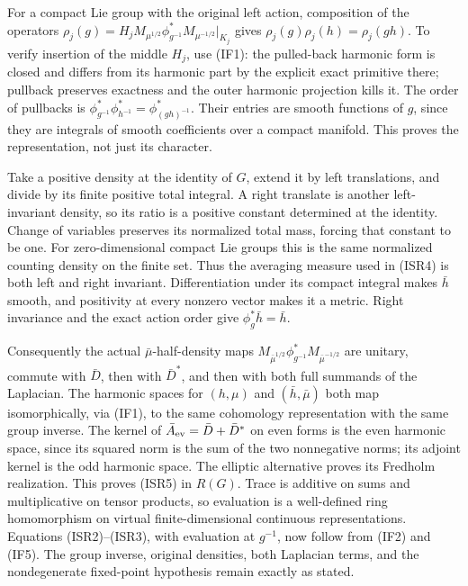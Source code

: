 \documentclass[
  11pt,
]{article}
\begin{document}
For a compact Lie group with the original left action, composition of
the operators
\(\rho_j(g)=H_jM_{\mu^{1/2}}\phi_{g^{-1}}^*M_{\mu^{-1/2}}|_{K_j}\) gives
\(\rho_j(g)\rho_j(h)=\rho_j(gh)\). To verify insertion of the middle
\(H_j\), use (IF1): the pulled-back harmonic form is closed and differs
from its harmonic part by the explicit exact primitive there; pullback
preserves exactness and the outer harmonic projection kills it. The
order of pullbacks is
\(\phi_{g^{-1}}^*\phi_{h^{-1}}^*=\phi_{(gh)^{-1}}^*\). Their entries are
smooth functions of \(g\), since they are integrals of smooth
coefficients over a compact manifold. This proves the representation,
not just its character.

Take a positive density at the identity of \(G\), extend it by left
translations, and divide by its finite positive total integral. A right
translate is another left-invariant density, so its ratio is a positive
constant determined at the identity. Change of variables preserves its
normalized total mass, forcing that constant to be one. For
zero-dimensional compact Lie groups this is the same normalized counting
density on the finite set. Thus the averaging measure used in (ISR4) is
both left and right invariant. Differentiation under its compact
integral makes \(\bar h\) smooth, and positivity at every nonzero vector
makes it a metric. Right invariance and the exact action order give
\(\phi_g^*\bar h=\bar h\).

Consequently the actual \(\bar\mu\)-half-density maps
\(M_{\bar\mu^{1/2}}\phi_{g^{-1}}^*M_{\bar\mu^{-1/2}}\) are unitary,
commute with \(\bar D\), then with \(\bar D^*\), and then with both full
summands of the Laplacian. The harmonic spaces for \((h,\mu)\) and
\((\bar h,\bar\mu)\) both map isomorphically, via (IF1), to the same
cohomology representation with the same group inverse. The kernel of
\(\bar A_{\rm ev}=\bar D+\bar D^*\) on even forms is the even harmonic
space, since its squared norm is the sum of the two nonnegative norms;
its adjoint kernel is the odd harmonic space. The elliptic alternative
proves its Fredholm realization. This proves (ISR5) in \(R(G)\). Trace
is additive on sums and multiplicative on tensor products, so evaluation
is a well-defined ring homomorphism on virtual finite-dimensional
continuous representations. Equations (ISR2)--(ISR3), with evaluation at
\(g^{-1}\), now follow from (IF2) and (IF5). The group inverse, original
densities, both Laplacian terms, and the nondegenerate fixed-point
hypothesis remain exactly as stated.
\end{document}
